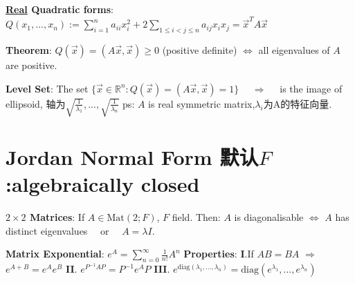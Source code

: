 \documentclass[9pt]{article}
\begin{document}
\textbf{\underline{Real} Quadratic forms}: $Q(x_1,...,x_n):=\sum_{i=1}^n a_{ii}x_i^2+2\sum_{1\le i<j\le n}a_{ij}x_ix_j=\vec{x}^TA\vec{x}$ 

\vspace{-1pt}

\quad \textbf{Theorem}: $Q(\vec{x})=(A\vec{x},\vec{x})\geq0$ (positive definite) $\Leftrightarrow$ all eigenvalues of $A$ are positive. 

\textbf{Level Set}: {\footnotesize The set $\{\vec{x}\in\mathbb{R}^n:Q(\vec{x})=(A\vec{x},\vec{x})=1\}$ \ \ $\Rightarrow$ \ \ is the image of ellipsoid, 轴为$\sqrt{\frac{1}{\lambda_1}},...,\sqrt{\frac{1}{\lambda_n}}$} {\scriptsize ps: $A$ is real symmetric matrix,$\lambda_i$为A的特征向量.}

\vspace{-1pt}


\section{Jordan Normal Form {\scriptsize 默认$F$:algebraically closed}} %

\textbf{$2\times2$ Matrices}: If $A\in\text{Mat}(2;F)$, $F$ field. \quad Then: $A$ is diagonalisable $\Leftrightarrow$ $A$ has distinct eigenvalues \ \ or \ \ $A=\lambda I$.

\textbf{Matrix Exponential}: {\small $e^{A}=\sum_{n=0}^{\infty}\frac{1}{n!}A^n$} \quad \textbf{Properties}: {\footnotesize \textbf{I}.If $AB=BA$ $\Rightarrow$ $e^{A+B}=e^{A}e^{B}$ \quad \textbf{II}. $e^{P^{-1}AP}=P^{-1}e^{A}P$ \quad \textbf{III}. $e^{\text{diag}(\lambda_1,...,\lambda_n)}=\text{diag}(e^{\lambda_1},...,e^{\lambda_n})$}
\end{document}
